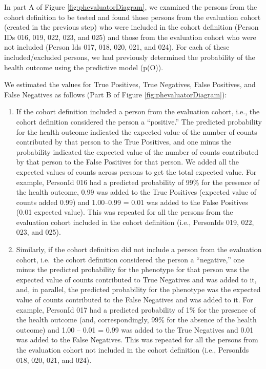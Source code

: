 \documentclass[11pt]{book}
\theoremstyle{definition}
\theoremstyle{definition}
\theoremstyle{definition}
\theoremstyle{remark}
\begin{document}
In part A of Figure \ref{fig:phevaluatorDiagram}, we examined the
persons from the cohort definition to be tested and found those persons
from the evaluation cohort (created in the previous step) who were
included in the cohort definition (Person IDs 016, 019, 022, 023, and
025) and those from the evaluation cohort who were not included (Person
Ids 017, 018, 020, 021, and 024). For each of these included/excluded
persons, we had previously determined the probability of the health
outcome using the predictive model (p(O)).

We estimated the values for True Positives, True Negatives, False
Positives, and False Negatives as follows (Part B of Figure
\ref{fig:phevaluatorDiagram}):

\begin{enumerate}
\def\labelenumi{\arabic{enumi}.}
\item
  If the cohort definition included a person from the evaluation cohort,
  i.e., the cohort definition considered the person a ``positive.'' The
  predicted probability for the health outcome indicated the expected
  value of the number of counts contributed by that person to the True
  Positives, and one minus the probability indicated the expected value
  of the number of counts contributed by that person to the False
  Positives for that person. We added all the expected values of counts
  across persons to get the total expected value. For example, PersonId
  016 had a predicted probability of 99\% for the presence of the health
  outcome, 0.99 was added to the True Positives (expected value of
  counts added 0.99) and 1.00--0.99 = 0.01 was added to the False
  Positives (0.01 expected value). This was repeated for all the persons
  from the evaluation cohort included in the cohort definition (i.e.,
  PersonIds 019, 022, 023, and 025).
\item
  Similarly, if the cohort definition did not include a person from the
  evaluation cohort, i.e.~the cohort definition considered the person a
  ``negative,'' one minus the predicted probability for the phenotype
  for that person was the expected value of counts contributed to True
  Negatives and was added to it, and, in parallel, the predicted
  probability for the phenotype was the expected value of counts
  contributed to the False Negatives and was added to it. For example,
  PersonId 017 had a predicted probability of 1\% for the presence of
  the health outcome (and, correspondingly, 99\% for the absence of the
  health outcome) and 1.00 -- 0.01 = 0.99 was added to the True
  Negatives and 0.01 was added to the False Negatives. This was repeated
  for all the persons from the evaluation cohort not included in the
  cohort definition (i.e., PersonIds 018, 020, 021, and 024).
\end{enumerate}
\end{document}
